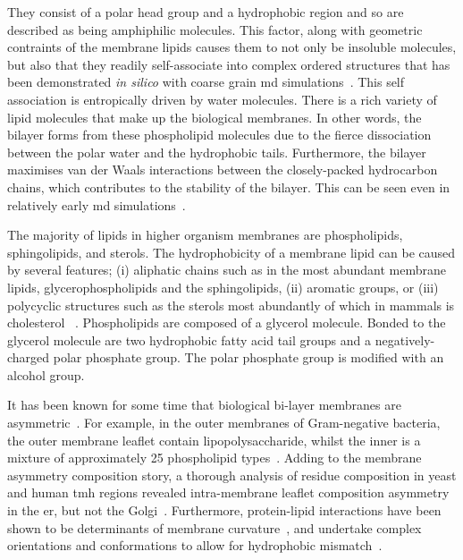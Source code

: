 They consist of a polar head group and a hydrophobic region and so are described as being amphiphilic molecules.
This factor, along with geometric contraints of the membrane lipids causes them to not only be insoluble molecules, but also that they readily self-associate into complex ordered structures that has been demonstrated \textit{in silico} with coarse grain \gls{md} simulations~\cite{Scott2008}.
This self association is entropically driven by water molecules.
There is a rich variety of lipid molecules that make up the biological membranes.
In other words, the bilayer forms from these phospholipid molecules due to the fierce dissociation between the polar water and the hydrophobic tails.
Furthermore, the bilayer maximises van der Waals interactions between the closely-packed hydrocarbon chains, which contributes to the stability of the bilayer.
This can be seen even in relatively early \gls{md} simulations~\cite{Goetz1998}.

The majority of lipids in higher organism membranes are phospholipids, sphingolipids, and sterols.
The hydrophobicity of a membrane lipid can be caused by several features; (i) aliphatic chains such as in the most abundant membrane lipids, glycerophospholipids and the sphingolipids, (ii) aromatic groups, or (iii) polycyclic structures such as the sterols most abundantly of which in mammals is cholesterol ~\cite{Helenius1975, Lichtenberg1983}.
Phospholipids are composed of a glycerol molecule.
Bonded to the glycerol molecule are two hydrophobic fatty acid tail groups and a negatively-charged polar phosphate group.
The polar phosphate group is modified with an alcohol group.


It has been known for some time that biological bi-layer membranes are asymmetric~\cite{Singer1972, OpdenKamp1979}.
For example, in the outer membranes of Gram-negative bacteria, the outer membrane leaflet contain lipopolysaccharide, whilst the inner is a mixture of approximately 25 phospholipid types~\cite{VanMeer2008}.
Adding to the membrane asymmetry composition story, a thorough analysis of residue composition in yeast and human \gls{tmh} regions revealed intra-membrane leaflet composition asymmetry in the \gls{er}, but not the Golgi~\cite{Sharpe2010}.
Furthermore, protein-lipid interactions have been shown to be determinants of membrane curvature~\cite{Jensen2004}, and undertake complex orientations and conformations to allow for hydrophobic mismatch~\cite{Planque2003}.

